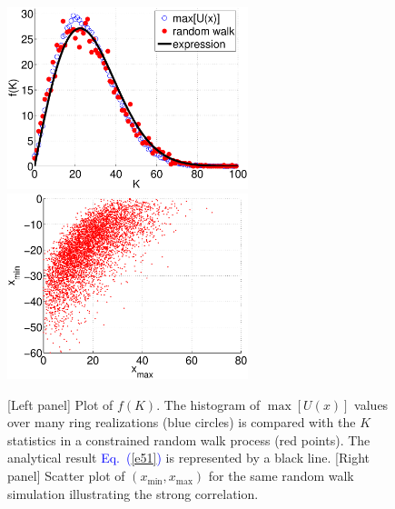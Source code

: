 \documentclass[aps,pre,floats,floatfix,twocolumn]{revtex4}
\newcommand{\Eq}[1]{\textcolor{blue}{Eq.\!\!~(\ref{#1})}}
\begin{document}
\begin{figure}
\includegraphics[width=7cm]{f_K.eps} 
\includegraphics[width=7cm]{MinMax.eps} 

\caption{
[Left panel] Plot of $f(K)$. 
The histogram of $\max[U(x)]$ values over many ring realizations (blue circles)  
is compared with the $K$ statistics in a constrained random walk process (red points).
The analytical result \Eq{e51} is represented by a black line.
[Right panel] Scatter plot of ${(x_{\text{min}}, x_{\text{max}})}$ for the 
same random walk simulation illustrating the strong correlation. }

\label{pu}
\end{figure}



\clearpage
\end{document}
